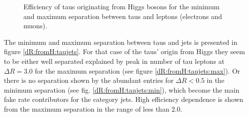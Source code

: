 \begin{figure}
\begin{subfigure}[t]{0.49\textwidth}
                \label{dR:fromH:taulepton:max}
                \end{subfigure}
\caption[Efficiency of taus originating from Higgs bosons for the separation between taus and leptons.]{Efficiency of taus originating from Higgs bosons for the minimum and maximum separation between taus and leptons (electrons and muons).}
\label{dR:fromH:taulepton}
\end{figure}
%
The minimum and maximum separation between taus and jets is presented in figure \ref{dR:fromH:taujets}. For that case of the taus' origin from Higgs they seem to be either well separated explained by peak in number of tau leptons at $\Delta R=3.0$ for the maximum separation (see figure \ref{dR:fromH:taujets:max}). Or there is no separation shown by the abundant entries for $\Delta R<0.5$ in the minimum separation (see fig. \ref{dR:fromH:taujets:min}), which become the main fake rate contributors for the category jets. High efficiency dependence is shown from the maximum separation in the range of less than $2.0$.\newline
%
